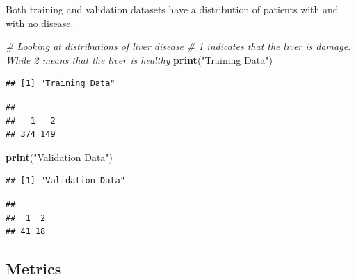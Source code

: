 \documentclass[]{article}
\newenvironment{Shaded}{\begin{snugshade}}{\end{snugshade}}
\newcommand{\CommentTok}[1]{\textcolor[rgb]{0.56,0.35,0.01}{\textit{#1}}}
\newcommand{\KeywordTok}[1]{\textcolor[rgb]{0.13,0.29,0.53}{\textbf{#1}}}
\newcommand{\NormalTok}[1]{#1}
\newcommand{\OperatorTok}[1]{\textcolor[rgb]{0.81,0.36,0.00}{\textbf{#1}}}
\newcommand{\StringTok}[1]{\textcolor[rgb]{0.31,0.60,0.02}{#1}}
\begin{document}
Both training and validation datasets have a distribution of patients
with and with no disease.

\begin{Shaded}
\begin{Highlighting}[]
\CommentTok{# Looking at distributions of liver disease}
\CommentTok{# 1 indicates that the liver is damage. While 2 means that the liver is healthy }
\KeywordTok{print}\NormalTok{(}\StringTok{"Training Data"}\NormalTok{)}
\end{Highlighting}
\end{Shaded}

\begin{verbatim}
## [1] "Training Data"
\end{verbatim}

\begin{Shaded}
\end{Shaded}

\begin{verbatim}
## 
##   1   2 
## 374 149
\end{verbatim}

\begin{Shaded}
\begin{Highlighting}[]
\KeywordTok{print}\NormalTok{(}\StringTok{"Validation Data"}\NormalTok{)}
\end{Highlighting}
\end{Shaded}

\begin{verbatim}
## [1] "Validation Data"
\end{verbatim}

\begin{Shaded}
\end{Shaded}

\begin{verbatim}
## 
##  1  2 
## 41 18
\end{verbatim}

\subsection{Metrics}
\label{sec:metrics}
\end{document}
